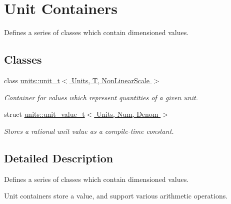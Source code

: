 \hypertarget{group___unit_containers}{}\section{Unit Containers}
\label{group___unit_containers}


Defines a series of classes which contain dimensioned values.  


\subsection*{Classes}
\begin{DoxyCompactItemize}
\item 
class \hyperlink{classunits_1_1unit__t}{units\+::unit\+\_\+t$<$ Units, T, Non\+Linear\+Scale $>$}
\begin{DoxyCompactList}\small\item\em Container for values which represent quantities of a given unit. \end{DoxyCompactList}\item 
struct \hyperlink{structunits_1_1unit__value__t}{units\+::unit\+\_\+value\+\_\+t$<$ Units, Num, Denom $>$}
\begin{DoxyCompactList}\small\item\em Stores a rational unit value as a compile-\/time constant. \end{DoxyCompactList}\end{DoxyCompactItemize}


\subsection{Detailed Description}
Defines a series of classes which contain dimensioned values. 

Unit containers store a value, and support various arithmetic operations. 